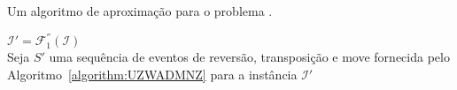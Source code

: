 \begin{algorithm}[!tbh]
  \caption{Um algoritmo de aproximação para o problema \SbFIRTM{}.\label{algorithm:JRHFSYXO}}
  $\mathcal{I}' = \mathcal{F}_{1}^{''}(\mathcal{I})$ \\
  Seja $S'$ uma sequência de eventos de reversão, transposição e move fornecida pelo Algoritmo~\ref{algorithm:UZWADMNZ} para a instância $\mathcal{I}'$ \\
\end{algorithm}